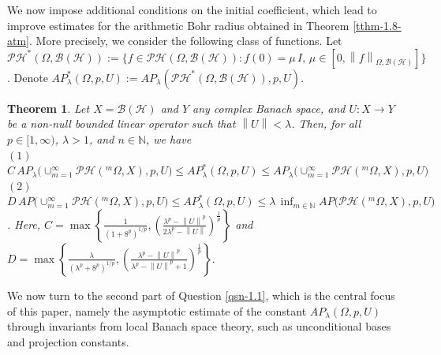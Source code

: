 \documentclass[a4paper,11pt, reqno]{amsart}
\newtheorem{thm}{Theorem}[section]
\theoremstyle{definition}
\newcommand{\norm}[1]{\left\lVert#1\right\rVert}
\begin{document}
We now impose additional conditions on the initial coefficient, which lead to improve estimates for the arithmetic Bohr radius obtained in Theorem \ref{tthm-1.8-atm}. More precisely, we consider the following class of functions. Let $\mathcal{PH}^{*}(\Omega,\mathcal{B}(\mathcal{H})):=\{f \in \mathcal{PH}(\Omega,\mathcal{B}(\mathcal{H})): f(0)=\mu\, I, \, \mu \in [0, \norm{f}_{\Omega,\mathcal{B}(\mathcal{H})}]\}$. Denote $AP^{*}_{\lambda}(\Omega, p,U):= AP_{\lambda}(\mathcal{PH}^{*}(\Omega,\mathcal{B}(\mathcal{H})), p,U)$.
\begin{thm} \label{tthm-1.9-atm}
	Let $X=\mathcal{B}(\mathcal{H})$ and $Y$ any complex Banach space, and $U: X \rightarrow Y$ be a non-null bounded linear operator such that $\norm{U}< \lambda$. Then, for all $p\in[1,\infty)$, $\lambda>1$, and $n \in \mathbb{N}$, we have\\
	$(1)$ $C\, AP_{\lambda}\big(\cup^{\infty}_{m=1} \mathcal{PH}(^m \Omega,X), p,U\big) \leq AP^{*}_{\lambda}(\Omega, p,U) \leq AP_{\lambda}\big(\cup^{\infty}_{m=1} \mathcal{PH}(^m \Omega,X), p,U\big)$ \\
	$(2)$ $D\, AP\big(\cup^{\infty}_{m=1} \mathcal{PH}(^m \Omega,X), p,U\big) \leq AP^{*}_{\lambda}(\Omega, p,U) \leq \lambda \, \inf_{m\in \mathbb{N}} AP\big( \mathcal{PH}(^m \Omega,X), p,U\big)$.
	Here,
	$
	C=
	\max \left\{\frac{1}{(1+8^p)^{1/p}}, \left(\frac{\lambda^p - \norm{U}^p}{2\lambda^p - \norm{U}}\right)^{\frac{1}{p}}\right\}
	$
	and
	$D=
	\max \left\{\frac{\lambda}{(\lambda^p+8^p)^{1/p}}, \left(\frac{\lambda^p - \norm{U}^p}{\lambda^p - \norm{U}^p +1}\right)^{\frac{1}{p}}\right\}.
	$
\end{thm}
We now turn to the second part of Question \ref{qsn-1.1}, which is the central focus of this paper, namely the asymptotic estimate of the constant $AP_{\lambda}(\Omega, p,U)$ through invariants from local Banach space theory, such as unconditional bases and projection constants. 
\end{document}
